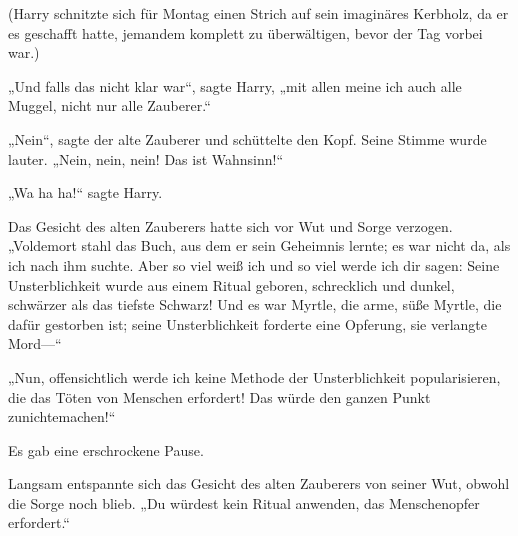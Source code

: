 (Harry schnitzte sich für Montag einen Strich auf sein imaginäres Kerbholz, da er es geschafft hatte, jemandem komplett zu überwältigen, bevor der Tag vorbei war.)

„Und falls das nicht klar war“, sagte Harry, „mit allen meine ich auch alle Muggel, nicht nur alle Zauberer.“

„Nein“, sagte der alte Zauberer und schüttelte den Kopf. Seine Stimme wurde lauter. „Nein, nein, nein! Das ist Wahnsinn!“

„Wa ha ha!“ sagte Harry.

Das Gesicht des alten Zauberers hatte sich vor Wut und Sorge verzogen. „Voldemort stahl das Buch, aus dem er sein Geheimnis lernte; es war nicht da, als ich nach ihm suchte. Aber so viel weiß ich und so viel werde ich dir sagen: Seine Unsterblichkeit wurde aus einem Ritual geboren, schrecklich und dunkel, schwärzer als das tiefste Schwarz! Und es war Myrtle, die arme, süße Myrtle, die dafür gestorben ist; seine Unsterblichkeit forderte eine Opferung, sie verlangte Mord—“

„Nun, offensichtlich werde ich keine Methode der Unsterblichkeit popularisieren, die das Töten von Menschen erfordert! Das würde den ganzen Punkt zunichtemachen!“

Es gab eine erschrockene Pause.

Langsam entspannte sich das Gesicht des alten Zauberers von seiner Wut, obwohl die Sorge noch blieb. „Du würdest kein Ritual anwenden, das Menschenopfer erfordert.“

